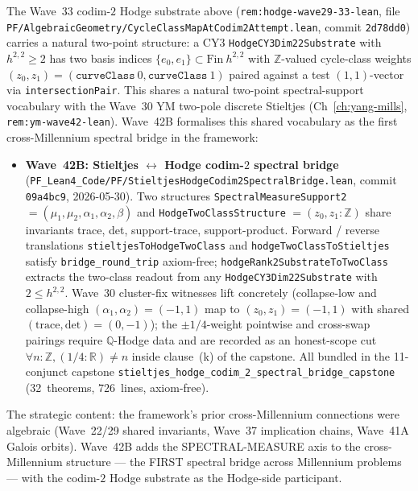 \begin{remark}\label{rem:hodge-wave42-lean}
The Wave~33 codim-$2$ Hodge substrate above (\texttt{rem:hodge-wave29-33-lean}, file \texttt{PF/AlgebraicGeometry/CycleClassMapAtCodim2Attempt.lean}, commit \texttt{2d78dd0}) carries a natural two-point structure: a CY$3$ \texttt{HodgeCY3Dim22Substrate} with $h^{2,2} \geq 2$ has two basis indices $\{e_0, e_1\} \subset \mathrm{Fin}~h^{2,2}$ with $\mathbb{Z}$-valued cycle-class weights $(z_0, z_1) = (\texttt{curveClass}~0, \texttt{curveClass}~1)$ paired against a test $(1, 1)$-vector via \texttt{intersectionPair}. This shares a natural two-point spectral-support vocabulary with the Wave~30 YM two-pole discrete Stieltjes (Ch~\ref{ch:yang-mills}, \texttt{rem:ym-wave42-lean}). Wave~42B formalises this shared vocabulary as the first cross-Millennium spectral bridge in the framework:
\begin{itemize}
  \item \textbf{Wave~42B: Stieltjes $\leftrightarrow$ Hodge codim-$2$ spectral bridge} (\texttt{PF\_Lean4\_Code/PF/StieltjesHodgeCodim2SpectralBridge.lean}, commit \texttt{09a4bc9}, 2026-05-30). Two structures \texttt{SpectralMeasureSupport2} $= (\mu_1, \mu_2, \alpha_1, \alpha_2, \beta)$ and \texttt{HodgeTwoClassStructure} $= (z_0, z_1 : \mathbb{Z})$ share invariants trace, det, support-trace, support-product. Forward / reverse translations \texttt{stieltjesToHodgeTwoClass} and \texttt{hodgeTwoClassToStieltjes} satisfy \texttt{bridge\_round\_trip} axiom-free; \texttt{hodgeRank2SubstrateToTwoClass} extracts the two-class readout from any \texttt{HodgeCY3Dim22Substrate} with $2 \leq h^{2,2}$. Wave~30 cluster-fix witnesses lift concretely (collapse-low and collapse-high $(\alpha_1, \alpha_2) = (-1, 1)$ map to $(z_0, z_1) = (-1, 1)$ with shared $(\mathrm{trace}, \mathrm{det}) = (0, -1)$); the $\pm 1/4$-weight pointwise and cross-swap pairings require $\mathbb{Q}$-Hodge data and are recorded as an honest-scope cut $\forall n : \mathbb{Z}, (1/4 : \mathbb{R}) \neq n$ inside clause~(k) of the capstone. All bundled in the 11-conjunct capstone \texttt{stieltjes\_hodge\_codim\_2\_spectral\_bridge\_capstone} (32~theorems, 726~lines, axiom-free).
\end{itemize}
The strategic content: the framework's prior cross-Millennium connections were algebraic (Wave~22/29 shared invariants, Wave~37 implication chains, Wave~41A Galois orbits). Wave~42B adds the SPECTRAL-MEASURE axis to the cross-Millennium structure --- the FIRST spectral bridge across Millennium problems --- with the codim-$2$ Hodge substrate as the Hodge-side participant.


\end{remark}
